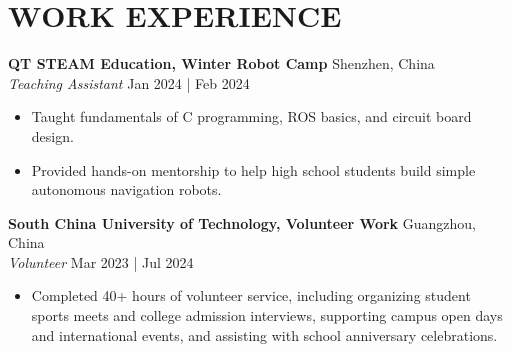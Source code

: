 \documentclass[a4paper,9pt]{extarticle}
\begin{document}
\section*{{\textbf{\fontsize{14pt}{8pt}\selectfont W}\textbf{\scshape ORK EXPERIENCE}}}
\textbf{QT STEAM Education, Winter Robot Camp}  \hfill Shenzhen, China\\ %
\textit{Teaching Assistant} \hfill Jan 2024 | Feb 2024 %
\begin{itemize}
    \item Taught fundamentals of C programming, ROS basics, and circuit board design.
    \item Provided hands-on mentorship to help high school students build simple autonomous navigation robots.
\end{itemize}
\textbf{South China University of Technology, Volunteer Work}  \hfill Guangzhou, China\\ %
\textit{Volunteer} \hfill Mar 2023 | Jul 2024 %
\begin{itemize}
    \item  Completed 40+ hours of volunteer service, including organizing student sports meets and college admission interviews, supporting campus open days and international events, and assisting with school anniversary celebrations.
\end{itemize}

\end{document}
